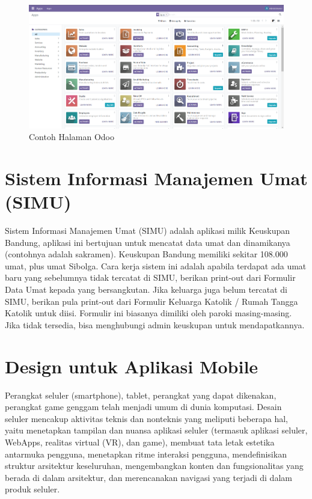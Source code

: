 \begin{figure}[H]
	\centering
	\includegraphics[scale=0.4]{Gambar/halamanOdoo.png}
	\caption{Contoh Halaman Odoo} 
	\label{fig:halamanOdoo}
\end{figure}

\section{Sistem Informasi Manajemen Umat (SIMU)}
\label{sec:simu}
Sistem Informasi Manajemen Umat (SIMU) adalah aplikasi milik Keuskupan Bandung, aplikasi ini bertujuan untuk mencatat data umat dan dinamikanya (contohnya adalah sakramen). Keuskupan Bandung memiliki sekitar 108.000 umat, plus umat Sibolga. Cara kerja sistem ini adalah apabila terdapat ada umat baru yang sebelumnya tidak tercatat di SIMU, berikan print-out dari Formulir Data Umat kepada yang bersangkutan. Jika keluarga juga belum tercatat di SIMU, berikan pula print-out dari Formulir Keluarga Katolik / Rumah Tangga Katolik untuk diisi. Formulir ini biasanya dimiliki oleh paroki masing-masing. Jika tidak tersedia, bisa menghubungi admin keuskupan untuk mendapatkannya.


\section{Design untuk Aplikasi Mobile}
\label{sec:designMobility}
Perangkat seluler (smartphone), tablet, perangkat yang dapat dikenakan, perangkat game genggam telah menjadi umum di dunia komputasi. Desain seluler mencakup aktivitas teknis dan nonteknis yang meliputi beberapa hal, yaitu menetapkan tampilan dan nuansa aplikasi seluler (termasuk aplikasi seluler, WebApps, realitas virtual (VR), dan game), membuat tata letak estetika antarmuka pengguna, menetapkan ritme interaksi pengguna, mendefinisikan struktur arsitektur keseluruhan, mengembangkan konten dan fungsionalitas yang berada di dalam arsitektur, dan merencanakan navigasi yang terjadi di dalam produk seluler. 

